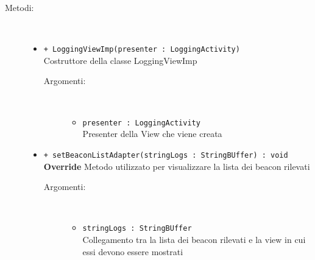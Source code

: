 \documentclass[../DefinizioneDiProdotto.tex]{subfiles}
\begin{document}
\begin{description}
\begin{itemize}
	\end{itemize}
	\item[Metodi:] \
	\begin{itemize}
		\item \texttt{+ LoggingViewImp(presenter : LoggingActivity)}\\
		Costruttore della classe LoggingViewImp
		\begin{description}
			\item[Argomenti:] \
			\begin{itemize}
				\item \texttt{presenter : LoggingActivity}\\
				Presenter della View che viene creata\end{itemize}
		\end{description}
		\item \texttt{+ setBeaconListAdapter(stringLogs : StringBUffer) : void}\\
		\textbf{Override} Metodo utilizzato per visualizzare la lista dei beacon rilevati 
		\begin{description}
			\item[Argomenti:] \
			\begin{itemize}
				\item \texttt{stringLogs : StringBUffer}\\
				Collegamento tra la lista dei beacon rilevati e la view in cui essi devono essere mostrati\end{itemize}
		\end{description}
	\end{itemize}
\end{description}
\end{document}
